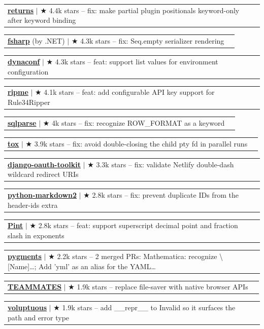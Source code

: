 \documentclass[letterpaper,11pt]{article}
\makeatletter
\newcommand{\resumeProjectHeading}[2]{
    \item
    \begin{tabular*}{0.97\textwidth}{l@{\extracolsep{\fill}}r}
      \small#1 & \hspace{8pt}\small#2 \\
    \end{tabular*}\vspace{-11.4pt}
}
\makeatother
\begin{document}
      \resumeProjectHeading{\textbf{\href{https://github.com/dry-python/returns/pull/2446}{returns}} $|$ {\small $\bigstar$ 4.4k stars} \textnormal{ -- fix: make partial plugin positionals keyword-only after keyword binding}}{}
      \resumeProjectHeading{\textbf{\href{https://github.com/dotnet/fsharp/pull/19317}{fsharp}} \textnormal{(by .NET)} $|$ {\small $\bigstar$ 4.3k stars} \textnormal{ -- fix: Seq.empty serializer rendering}}{}
      \resumeProjectHeading{\textbf{\href{https://github.com/dynaconf/dynaconf/pull/1421}{dynaconf}} $|$ {\small $\bigstar$ 4.3k stars} \textnormal{ -- feat: support list values for environment configuration}}{}
      \resumeProjectHeading{\textbf{\href{https://github.com/RipMeApp/ripme/pull/2172}{ripme}} $|$ {\small $\bigstar$ 4.1k stars} \textnormal{ -- feat: add configurable API key support for Rule34Ripper}}{}
      \resumeProjectHeading{\textbf{\href{https://github.com/andialbrecht/sqlparse/pull/860}{sqlparse}} $|$ {\small $\bigstar$ 4k stars} \textnormal{ -- fix: recognize ROW\_FORMAT as a keyword}}{}
      \resumeProjectHeading{\textbf{\href{https://github.com/tox-dev/tox/pull/3976}{tox}} $|$ {\small $\bigstar$ 3.9k stars} \textnormal{ -- fix: avoid double-closing the child pty fd in parallel runs}}{}
      \resumeProjectHeading{\textbf{\href{https://github.com/django-oauth/django-oauth-toolkit/pull/1750}{django-oauth-toolkit}} $|$ {\small $\bigstar$ 3.3k stars} \textnormal{ -- fix: validate Netlify double-dash wildcard redirect URIs}}{}
      \resumeProjectHeading{\textbf{\href{https://github.com/trentm/python-markdown2/pull/713}{python-markdown2}} $|$ {\small $\bigstar$ 2.8k stars} \textnormal{ -- fix: prevent duplicate IDs from the header-ids extra}}{}
      \resumeProjectHeading{\textbf{\href{https://github.com/hgrecco/pint/pull/2330}{Pint}} $|$ {\small $\bigstar$ 2.8k stars} \textnormal{ -- feat: support superscript decimal point and fraction slash in exponents}}{}
      \resumeProjectHeading{\textbf{\href{https://github.com/pygments/pygments/pulls?q=is\%3Apr\%20is\%3Amerged\%20author\%3Aapoorvdarshan}{pygments}} $|$ {\small $\bigstar$ 2.2k stars} \textnormal{ -- 2 merged PRs: Mathematica: recognize \textbackslash{}[Name]…; Add 'yml' as an alias for the YAML…}}{}
      \resumeProjectHeading{\textbf{\href{https://github.com/TEAMMATES/teammates/pull/13553}{TEAMMATES}} $|$ {\small $\bigstar$ 1.9k stars} \textnormal{ -- replace file-saver with native browser APIs}}{}
      \resumeProjectHeading{\textbf{\href{https://github.com/alecthomas/voluptuous/pull/546}{voluptuous}} $|$ {\small $\bigstar$ 1.9k stars} \textnormal{ -- add \_\_repr\_\_ to Invalid so it surfaces the path and error type}}{}
\end{document}
